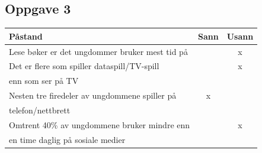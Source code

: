 \subsection*{Oppgave 3}
\begin{tabular}{l|c|c}
\textbf{Påstand} & \textbf{Sann} & \textbf{Usann} \\ \hline
Lese bøker er det ungdommer bruker mest tid på & & x	\\ \hline 
Det er flere som spiller dataspill/TV-spill & & x \\ 
enn som ser på TV & &\\ \hline
Nesten tre firedeler av ungdommene spiller på & x & \\
telefon/nettbrett& &\\ \hline
Omtrent 40\% av ungdommene bruker mindre enn & & x \\
en time daglig på sosiale medier & &
\end{tabular}
